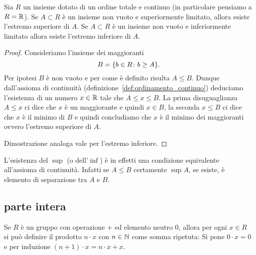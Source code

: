 \begin{theorem}%
  \label{th:sup}%
  \mymark{**}%
  Sia $R$ un insieme dotato di un ordine totale e continuo
  (in particolare pensiamo a $R={\mathbb R}$).
  Se $A\subset R$ è un insieme non vuoto
  e superiormente limitato, allora esiste l'estremo superiore di $A$.
  Se $A\subset R$ è un insieme non vuoto e inferiormente limitato 
  allora esiste l'estremo inferiore di $A$.
  \end{theorem}
  \begin{proof}
  \mymark{*}
  Consideriamo l'insieme dei maggioranti
  \[
  B = {\left\{  b\in R \colon b \ge A \right\}}.
  \]
  Per ipotesi $B$ è non vuoto e per come è definito risulta $A\le B$.
  Dunque dall'assioma di continuità (definizione~\ref{def:ordinamento_continuo}) 
  deduciamo l'esistenza di un numero $x\in {\mathbb R}$
  tale che $A\le x \le B$. La prima disuguaglianza $A\le x$ ci dice che $x$ è un
  maggiorante e quindi $x\in B$, la seconda $x\le B$ ci dice che $x$ è il minimo
  di $B$ e quindi concludiamo che $x$ è il minimo dei maggioranti 
  ovvero l'estremo superiore di $A$.

  Dimostrazione analoga vale per l'estremo inferiore.
\end{proof}

L'esistenza del $\sup$ (o dell'$\inf$)
è in effetti una condizione equivalente all'assioma di continuità.
Infatti se $A\le B$ certamente $\sup A$, se esiste, è elemento 
di separazione tra $A$ e $B$.

\subsection{parte intera}

Se $R$ è un gruppo con operazione $+$ ed elemento neutro $0$, 
allora per ogni $x\in R$ si può definire 
il prodotto $n\cdot x$ con $n\in {\mathbb N}$ come somma ripetuta:
Si pone $0\cdot x=0$ e per induzione $(n+1)\cdot x= n\cdot x + x$.
 
